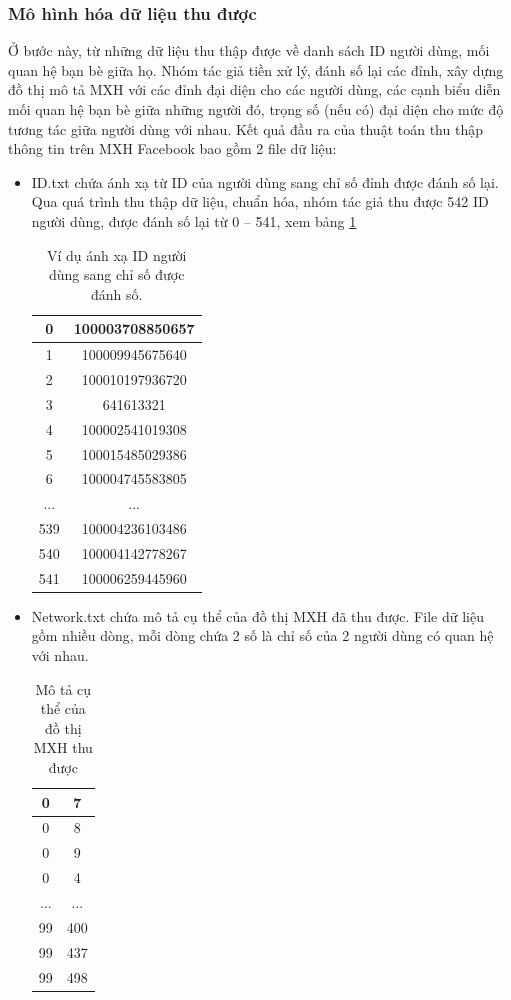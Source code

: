 		\subsubsection{Mô hình hóa dữ liệu thu được}
		Ở bước này, từ những dữ liệu thu thập được về danh sách ID người dùng, mối quan hệ bạn bè giữa họ. Nhóm tác giả tiền xử lý, đánh số lại các đỉnh, xây dựng đồ thị mô tả MXH với các đỉnh đại diện cho các người dùng, các cạnh biểu diễn mối quan hệ bạn bè giữa những người đó, trọng số (nếu có) đại diện cho mức độ tương tác giữa người dùng với nhau. Kết quả đầu ra của thuật toán thu thập thông tin trên MXH Facebook bao gồm 2 file dữ liệu:
		\begin {itemize}
			\item ID.txt chứa ánh xạ từ ID của người dùng sang chỉ số đỉnh được đánh số lại. Qua quá trình thu thập dữ liệu, chuẩn hóa, nhóm tác giả thu được 542 ID người dùng, được đánh số lại từ 0 – 541, xem bảng \ref{bang3_1}		
		\begin{table} [!htp]
			\centering 
			\begin{tabular}{|c|c|}
			\hline 
			0 & 100003708850657 \\ 
			\hline 
			1 & 100009945675640 \\ 
			\hline 
			2 & 100010197936720 \\ 
			\hline 
			3 & 641613321 \\ 
			\hline 
			4 & 100002541019308 \\ 
			\hline 
			5 & 100015485029386 \\ 
			\hline 
			6 & 100004745583805 \\ 
			\hline 
			... & ... \\ 
			\hline 
			539 & 100004236103486 \\ 
			\hline 
			540 & 100004142778267 \\ 
			\hline 
			541 & 100006259445960 \\ 
			\hline 
			\end{tabular} 
			\caption{Ví dụ ánh xạ ID người dùng sang chỉ số được đánh số.}
			\label{bang3_1}
		\end{table}
		 	\item Network.txt chứa mô tả cụ thể của đồ thị MXH đã thu được. File dữ liệu gồm nhiều dòng, mỗi dòng chứa 2 số là chỉ số của 2 người dùng có quan hệ với nhau.
		 
		 \begin{table} [!htp]
		 	\centering
		 	\begin{tabular}{|c|c|}
		 	\hline 
		 	0 & 7 \\ 
		 	\hline 
		 	0 & 8 \\ 
		 	\hline 
		 	0 & 9 \\ 
		 	\hline 
		 	0 & 4 \\ 
		 	\hline 
		 	... & ... \\ 
		 	\hline 
		 	99 & 400 \\ 
		 	\hline 
		 	99 & 437 \\ 
		 	\hline 
		 	99 & 498 \\ 
		 	\hline 
		 	\end{tabular}
	 		\caption{Mô tả cụ thể của đồ thị MXH thu được}
	 		\label{bang3_2} 
		 \end{table}
	 

\end{itemize}
